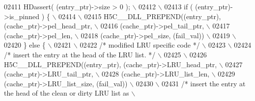 \begin{DoxyCode}
02411 \textcolor{preprocessor}{    HDassert( (entry\_ptr)->size > 0 );                                     \(\backslash\)}
02412 \textcolor{preprocessor}{                                                                           \(\backslash\)}
02413 \textcolor{preprocessor}{    if ( (entry\_ptr)->is\_pinned ) \{                                        \(\backslash\)}
02414 \textcolor{preprocessor}{                                                                           \(\backslash\)}
02415 \textcolor{preprocessor}{        H5C\_\_DLL\_PREPEND((entry\_ptr), (cache\_ptr)->pel\_head\_ptr,           \(\backslash\)}
02416 \textcolor{preprocessor}{                         (cache\_ptr)->pel\_tail\_ptr,                        \(\backslash\)}
02417 \textcolor{preprocessor}{                         (cache\_ptr)->pel\_len,                             \(\backslash\)}
02418 \textcolor{preprocessor}{                         (cache\_ptr)->pel\_size, (fail\_val))                \(\backslash\)}
02419 \textcolor{preprocessor}{                                                                           \(\backslash\)}
02420 \textcolor{preprocessor}{    \} else \{                                                               \(\backslash\)}
02421 \textcolor{preprocessor}{                                                                           \(\backslash\)}
02422 \textcolor{preprocessor}{        }\textcolor{comment}{/* modified LRU specific code */}\textcolor{preprocessor}{                                   \(\backslash\)}
02423 \textcolor{preprocessor}{                                                                           \(\backslash\)}
02424 \textcolor{preprocessor}{        }\textcolor{comment}{/* insert the entry at the head of the LRU list. */}\textcolor{preprocessor}{                \(\backslash\)}
02425 \textcolor{preprocessor}{                                                                           \(\backslash\)}
02426 \textcolor{preprocessor}{        H5C\_\_DLL\_PREPEND((entry\_ptr), (cache\_ptr)->LRU\_head\_ptr,           \(\backslash\)}
02427 \textcolor{preprocessor}{                         (cache\_ptr)->LRU\_tail\_ptr,                        \(\backslash\)}
02428 \textcolor{preprocessor}{             (cache\_ptr)->LRU\_list\_len,                        \(\backslash\)}
02429 \textcolor{preprocessor}{                         (cache\_ptr)->LRU\_list\_size, (fail\_val))           \(\backslash\)}
02430 \textcolor{preprocessor}{                                                                           \(\backslash\)}
02431 \textcolor{preprocessor}{        }\textcolor{comment}{/* insert the entry at the head of the clean or dirty LRU list as  \(\backslash\)}

\end{DoxyCode}
